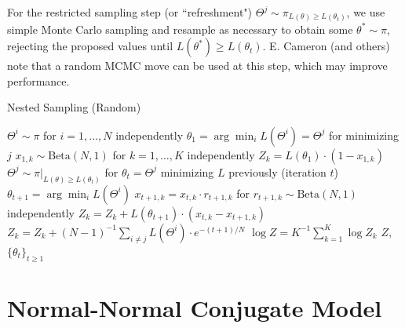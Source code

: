 \documentclass[psamsfonts]{amsart}
\begin{document}
For the restricted sampling step (or ``refreshment") $\Theta^j \sim \pi_{L(\theta) \geq L(\theta_t)}$, we use simple Monte Carlo sampling and resample as necessary to obtain some $\theta^* \sim \pi$, rejecting the proposed values until $L(\theta^*) \geq L(\theta_t)$. E. Cameron (and others) note that a random MCMC move can be used at this step, which may improve performance.

\begin{algorithm}
\caption{Nested Sampling (Random)}
\begin{algorithmic}
\State $\Theta^i \sim \pi$ for $i =1, \dots, N$ independently
\State $\theta_1 = \arg\min_i L(\Theta^i) = \Theta^j$ for minimizing $j$
\State $x_{1,k} \sim \text{Beta}(N,1)$ for $k = 1, \dots, K$ independently
\State $Z_k = L(\theta_1) \cdot (1-x_{1,k})$
\State $\Theta^j \sim \pi|_{L(\theta) \geq L(\theta_t)}$ for $\theta_t = \Theta^j$ minimizing $L$ previously (iteration $t$)
\State $\theta_{t+1} = \arg\min_i L(\Theta^i)$
\State $x_{t+1,k} = x_{t,k} \cdot r_{t+1,k}$ for $r_{t+1,k} \sim \text{Beta}(N,1)$ independently
\State $Z_k = Z_k + L(\theta_{t+1})\cdot (x_{t,k} - x_{t+1,k})$
\EndWhile
\State $Z_k = Z_k + (N-1)^{-1} \sum_{i\neq j} L(\Theta^i) \cdot e^{-(t+1)/N}$
\State $\log Z = K^{-1} \sum_{k=1}^K\log Z_k$
\State\Return $Z$, $\{\theta_t\}_{t\geq 1}$
\end{algorithmic}
\end{algorithm}

\section{Normal-Normal Conjugate Model}
\end{document}
